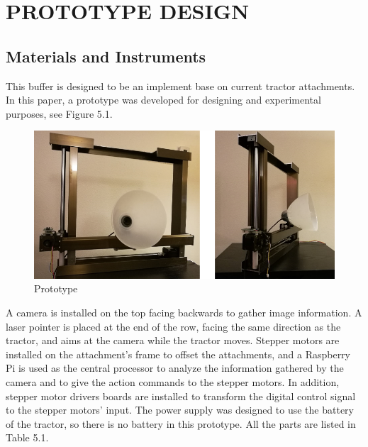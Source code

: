 \chapter{PROTOTYPE DESIGN}


\section{Materials and Instruments}
This buffer is designed to be an implement base on current tractor attachments. In this paper, a prototype was developed for designing and experimental purposes, see Figure 5.1. 
\begin{figure}[ht!]
\begin{center}
\includegraphics[scale = 0.6]{pics/prototype.png}
\caption{Prototype}
\end{center}
\end{figure}
A camera is installed on the top facing backwards to gather image information. A laser pointer is placed at the end of the row, facing the same direction as the tractor,  and aims at the camera while the tractor moves. Stepper motors are installed on the attachment's frame to offset the attachments, and a Raspberry Pi is used as the central processor to analyze the information gathered by the camera and to give the action commands to the stepper motors. In addition, stepper motor drivers boards are installed to transform the digital control signal to the stepper motors' input. The power supply was designed to use the battery of the tractor, so there is no battery in this prototype. All the parts are listed in Table 5.1.

